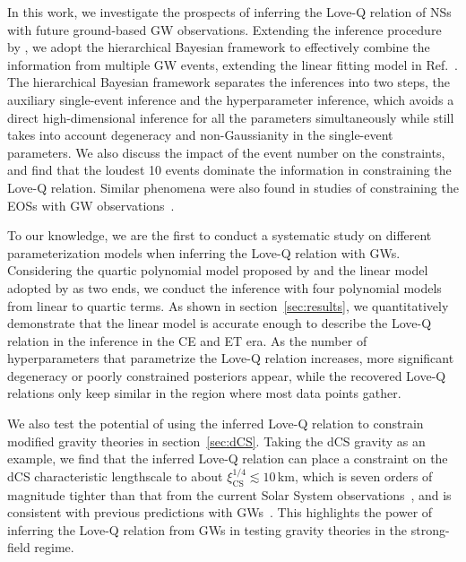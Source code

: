 \documentclass[a4paper,11pt]{article}
\begin{document}
In this work, we investigate the prospects of inferring the Love-Q relation of
NSs with future ground-based GW observations.  Extending the inference procedure
by \citet{Samajdar:2020xrd}, we adopt the hierarchical Bayesian framework to
effectively combine the information from multiple GW events, extending the
linear fitting model in Ref.~\cite{Samajdar:2020xrd}. The hierarchical Bayesian
framework separates the inferences into two steps, the auxiliary single-event
inference and the hyperparameter inference, which avoids a direct
high-dimensional inference for all the parameters simultaneously while still
takes into account degeneracy and non-Gaussianity in the single-event
parameters. We also discuss the impact of the event number on the constraints,
and find that the loudest 10 events dominate the information in constraining the
Love-Q relation. Similar phenomena were also found in studies of constraining
the EOSs with GW observations~\cite{Lackey:2014fwa, Landry:2020vaw,
Pang:2020ilf, Finstad:2022oni, Bandopadhyay:2024zrr, Wang:2024xon}.

To our knowledge, we are the first to conduct a systematic study on different
parameterization models when inferring the Love-Q relation with GWs. Considering
the quartic polynomial model proposed by \citet{Yagi:2013awa} and the linear
model adopted by \citet{Samajdar:2020xrd} as two ends, we conduct the inference
with four polynomial models from linear to quartic terms. As shown in 
section~\ref{sec:results}, we quantitatively demonstrate that the linear model
is accurate enough to describe the Love-Q relation in the inference in the CE
and ET era. As the number of hyperparameters that parametrize the Love-Q
relation increases, more significant degeneracy or poorly constrained posteriors
appear, while the recovered Love-Q relations only keep similar in the region
where most data points gather.

We also test the potential of using the inferred Love-Q relation to constrain
modified gravity theories in section~\ref{sec:dCS}.  Taking the dCS gravity as
an example, we find that the inferred Love-Q relation can place a constraint on
the dCS characteristic lengthscale to about $\xi_{\mathrm{CS}}^{1/4} \lesssim
10$\,km, which is seven orders of magnitude tighter than that from the current
Solar System observations~\cite{Ali-Haimoud:2011zme, Yagi:2012ya}, and is
consistent with previous predictions with GWs~\cite{Yagi:2013bca, Yagi:2013awa}.
This highlights the power of inferring the Love-Q relation from GWs in testing
gravity theories in the strong-field regime. 
\end{document}
